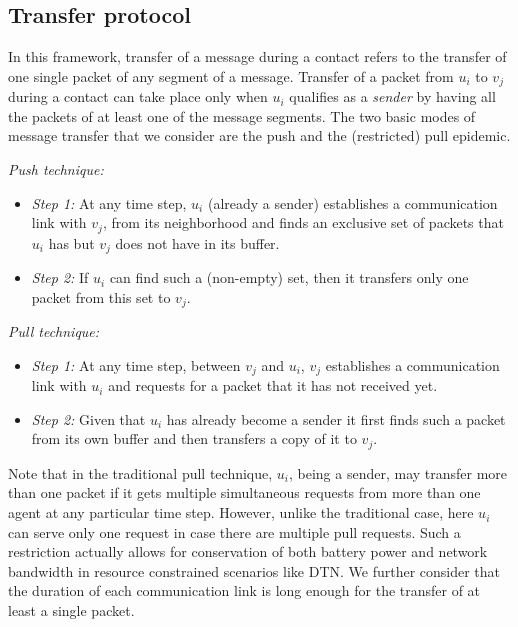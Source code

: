 \subsection{Transfer protocol}
In this framework, transfer of a message during a contact refers to the transfer of one single packet of any segment of a message. 
Transfer of a packet from $u_i$ to $v_j$ during a contact can take place only 
when $u_i$ qualifies as a {\em sender} by having all the packets of at least one of the message segments. 
The two basic modes of message transfer that we consider are the push and the (restricted) pull epidemic. 

 \noindent \emph{Push technique:} 
  \begin{itemize}
   \item \emph{Step 1:} At any time step, $u_i$ (already a sender) establishes a communication link with $v_j$, 
   from its neighborhood and finds an exclusive set of packets that $u_i$ has but $v_j$ does not have in its buffer. 
   \item \emph{Step 2:} If $u_i$ can find such a (non-empty) set, then it transfers only one packet from this set to $v_j$. 
  \end{itemize}
 \noindent \emph{Pull technique:} 
 \begin{itemize}
  \item \emph{Step 1:} At any time step, between $v_j$ and $u_i$, $v_j$ establishes a communication link with $u_i$ 
  and requests for a packet that it has not received yet. 
  \item \emph{Step 2:} Given that $u_i$ has already become a sender it first finds such a packet from its own buffer and then transfers a copy of it to $v_j$.
 \end{itemize}
  Note that in the traditional pull technique, $u_i$, being a sender, may transfer more than one packet if it gets multiple simultaneous requests from more than one agent at any particular time step. However, unlike the traditional case, here $u_i$ can serve only one request in case there are multiple pull requests. Such a restriction actually allows for conservation of both battery power and network bandwidth in resource constrained scenarios like DTN. 
  We further consider that the duration of each communication link is long enough for the transfer of at least a single packet.  


